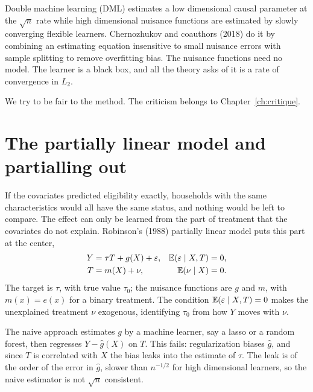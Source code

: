 Double machine learning (DML) estimates a low dimensional causal parameter at the $\sqrt{n}$ rate while high dimensional nuisance functions are estimated by slowly converging flexible learners. Chernozhukov and coauthors (2018) do it by combining an estimating equation insensitive to small nuisance errors with sample splitting to remove overfitting bias. The nuisance functions need no model. The learner is a black box, and all the theory asks of it is a rate of convergence in $L_2$.

We try to be fair to the method. The criticism belongs to Chapter~\ref{ch:critique}.

\section{The partially linear model and partialling out}\label{sec:dml:plm}

If the covariates predicted eligibility exactly, households with the same characteristics would all have the same status, and nothing would be left to compare. The effect can only be learned from the part of treatment that the covariates do not explain. Robinson's (1988) partially linear model puts this part at the center,
\begin{align}
Y &= \tau T + g(X) + \varepsilon, & \mathbb{E}(\varepsilon \mid X, T) &= 0, \label{eq:plm1}\\
T &= m(X) + \nu, & \mathbb{E}(\nu \mid X) &= 0. \label{eq:plm2}
\end{align}
The target is $\tau$, with true value $\tau_0$; the nuisance functions are $g$ and $m$, with $m(x) = e(x)$ for a binary treatment. The condition $\mathbb{E}(\varepsilon \mid X, T) = 0$ makes the unexplained treatment $\nu$ exogenous, identifying $\tau_0$ from how $Y$ moves with $\nu$.

The naive approach estimates $g$ by a machine learner, say a lasso or a random forest, then regresses $Y - \hat g(X)$ on $T$. This fails: regularization biases $\hat g$, and since $T$ is correlated with $X$ the bias leaks into the estimate of $\tau$. The leak is of the order of the error in $\hat g$, slower than $n^{-1/2}$ for high dimensional learners, so the naive estimator is not $\sqrt{n}$ consistent.

